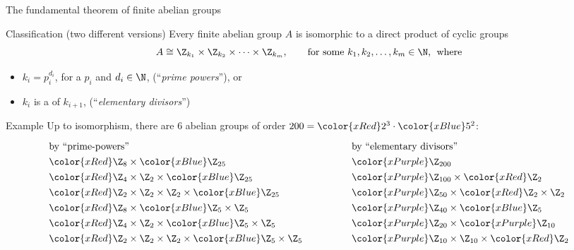 \documentclass[8pt, handout]{beamer}
\newcommand{\Pause}{}
\begin{document}
\begin{frame}{The fundamental theorem of finite abelian groups}
  
  \begin{block}{Classification (two different versions)}
    Every \alert{finite abelian group} $A$ is isomorphic to a
    \alert{direct product of cyclic groups}\Pause 
    \[
    A\cong\Z_{k_1}\times\Z_{k_2}\times\cdots\times\Z_{k_m},\qquad
    \text{for some $k_1,k_2,\dots,k_m\in\N$,\; where}
    \]
    \vspace{-4mm}
    \begin{itemize}
    \item $k_i=p_i^{d_i}$, for a  $p_i$ and
      $d_i\in\N$, (``\emph{prime powers}''), or
    \item $k_i$ is a  of $k_{i+1}$,
        (``\emph{elementary divisors}'')
    \end{itemize}
  \end{block}

  \pause

  \begin{exampleblock}{Example}
    Up to isomorphism, there are 6 abelian groups of order
    $200={\color{xRed}2^3}\cdot{\color{xBlue}5^2}$: \smallskip\Pause
    \vspace{-0.1in}
    \[
    \renewcommand{\arraystretch}{1.3}
    \begin{array}{llllll}
      \mbox{by ``prime-powers''} &&&&& \mbox{by ``elementary divisors''} \\
      {\color{xRed}\Z_8}\times{\color{xBlue}\Z_{25}}\Pause &&&&& {\color{xPurple}\Z_{200}}\Pause \\
      {\color{xRed}\Z_4\times\Z_2}\times {\color{xBlue}\Z_{25}}\Pause &&&&& 
      {\color{xPurple}\Z_{100}}\times {\color{xRed}\Z_2}\Pause \\
      {\color{xRed}\Z_2\times\Z_2\times\Z_2}\times {\color{xBlue}\Z_{25}}\Pause
      &&&&& {\color{xPurple}\Z_{50}}\times {\color{xRed}\Z_2\times\Z_2}\Pause \\
      {\color{xRed}\Z_8}\times {\color{xBlue}\Z_5\times\Z_5}\Pause &&&&& {\color{xPurple}\Z_{40}}\times 
      {\color{xBlue}\Z_5}\Pause \\
      {\color{xRed}\Z_4\times\Z_2}\times {\color{xBlue}\Z_5\times\Z_5}\Pause &&&&&
      {\color{xPurple}\Z_{20}}\times {\color{xPurple}\Z_{10}}\Pause \\ 
      {\color{xRed}\Z_2\times\Z_2\times\Z_2}\times
      {\color{xBlue}\Z_5\times\Z_5}\Pause &&&&& {\color{xPurple}\Z_{10}\times\Z_{10}}\times {\color{xRed}\Z_2}
    \end{array}
    \]
  \end{exampleblock}

\end{frame}
\end{document}
